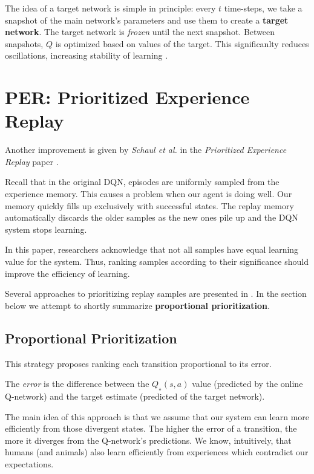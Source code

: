 The idea of a target network is simple in principle:
every \(t\) time-steps, we take a snapshot of the main network's parameters and use them to create a \textbf{target network}.
The target network is \emph{frozen} \cite{long-peak-rl} until the next snapshot.
Between snapshots, \(Q\) is optimized based on values of the target.
This significanlty reduces oscillations, increasing stability of learning \cite{atari-dqn}.

\section{PER: Prioritized Experience Replay}

Another improvement is given by \emph{Schaul et al.} in the \emph{Prioritized Experience Replay} paper \cite{per-paper}.

Recall that in the original DQN, episodes are uniformly sampled from the experience memory.
This causes a problem when our agent is doing well.
Our memory quickly fills up exclusively with successful states.
The replay memory automatically discards the older samples as the new ones pile up and the DQN system stops learning.

In this paper, researchers acknowledge that not all samples have equal learning value for the system.
Thus, ranking samples according to their significance should improve the efficiency of learning.

Several approaches to prioritizing replay samples are presented in \cite{per-paper}. In the section below we attempt to shortly summarize \textbf{proportional prioritization}.

\subsection{Proportional Prioritization}

This strategy proposes ranking each transition proportional to its error.

The \emph{error} is the difference between the \(Q_{\star}(s, a)\)  value (predicted by the online Q-network) and the target estimate (predicted of the target network).

The main idea of this approach is that we assume that our system can learn more efficiently from those divergent states.
The higher the error of a transition, the more it diverges from the Q-network's predictions.
We know, intuitively, that humans (and animals) also learn efficiently from experiences which contradict our expectations.